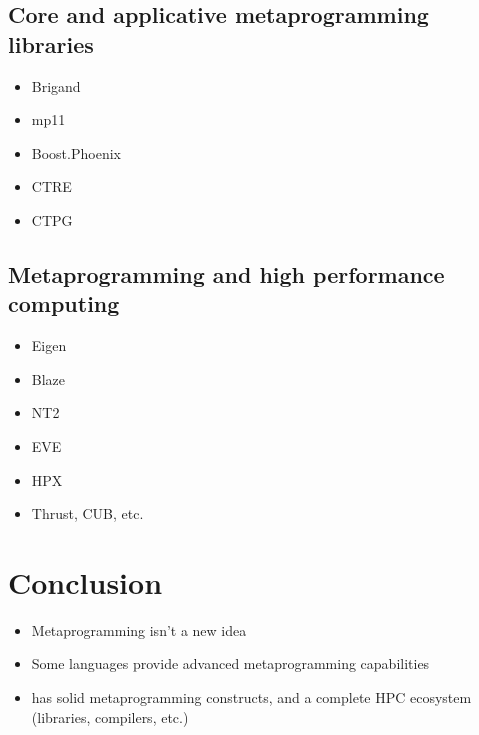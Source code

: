 \documentclass[../../main.tex]{subfiles}
\begin{document}
\subsection{Core and applicative metaprogramming libraries}

\begin{itemize}
\item Brigand

\item mp11
\end{itemize}


\begin{itemize}
\item Boost.Phoenix

\item CTRE

\item CTPG
\end{itemize}

\subsection{Metaprogramming and high performance computing}

\begin{itemize}
\item Eigen

\item Blaze

\item NT2

\item EVE

\item HPX

\item Thrust, CUB, etc.
\end{itemize}

\section{Conclusion}

\begin{itemize}
\item Metaprogramming isn't a new idea

\item Some languages provide advanced metaprogramming capabilities

\item \cpp has solid metaprogramming constructs, and a complete HPC ecosystem
(libraries, compilers, etc.)
\end{itemize}
\end{document}

